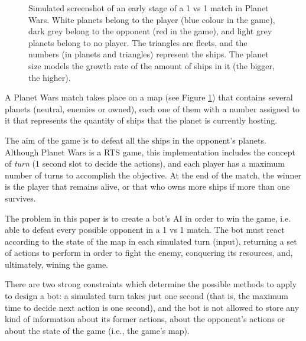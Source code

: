 \documentclass[conference]{IEEEtran}
\begin{document}

\begin{figure}[htb]
\tiny
\begin{center}
\end{center}
\caption{Simulated screenshot of an early stage of a 1 vs 1 match in Planet Wars. White planets belong to the player (blue colour in the game), dark grey belong to the opponent (red in the game), and light grey planets belong to no player. The triangles are fleets, and the numbers (in planets and triangles) represent the ships. The planet size models the growth rate of the amount of ships in it (the bigger, the higher).}
\label{figura:PlanetWars1}
\end{figure}

A Planet Wars match takes place on a map (see Figure \ref{figura:PlanetWars1}) that contains several planets (neutral, enemies or owned), each one of them with a number assigned to it that represents the quantity of ships that the planet is currently hosting.

The aim of the game is to defeat all the ships in the opponent's planets. Although Planet Wars is a RTS game, this implementation includes the concept of {\em turn} (1 second slot to decide the actions), and each player has a maximum number of turns to accomplish the objective. At the end of the match, the winner is the player that remains alive, or that who owns more ships if more than one survives.

The problem in this paper is to create a bot's AI in order to win the game, i.e. able to defeat every possible opponent in a 1 vs 1 match.%
 The bot must react according to the state of the map in each simulated turn (input), returning a set of actions to perform in order to fight the enemy, conquering its resources, and, ultimately, wining the game.

There are two strong constraints which determine the possible methods to apply to design a bot: a simulated turn takes just one second (that is, the maximum time to decide next action is one second), and the bot is not allowed to store any kind of information about its former actions, about the opponent's actions or about the state of the game (i.e., the game's map).
\end{document}
